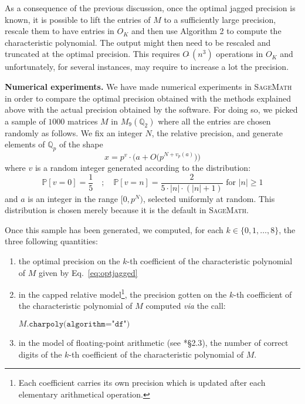 \documentclass{sig-alternate-05-2015}
\newcommand{\Q}{\mathbb Q}
\newcommand{\softO}{O\tilde{~}}
\begin{document}
\begin{rem} \label{rem:lift_for_optimal}
As a consequence of the previous discussion, once the optimal jagged 
precision is known, it is possible to lift the entries of $M$ to a sufficiently
large precision, rescale them to have entries in $O_K$
and then use Algorithm 2 to
compute the characteristic polynomial.
The output might then need to be rescaled and
 truncated at the optimal precision. 
This requires $\softO(n^3)$ operations in $O_K$ 
and unfortunately, for several instances, may require to increase a lot the precision.
\end{rem}

\medskip

\noindent
{\bf Numerical experiments.}
We have made numerical experiments in \textsc{SageMath}~\cite{sage}
in order to compare the optimal precision obtained with the methods
explained above with the actual precision obtained by the software.
For doing so, we picked a sample of $1000$ matrices $M$ in 
$M_9(\Q_2)$ where all the entries are chosen randomly as follows.
We fix an integer $N$, the relative precision, and generate elements of $\Q_p$ of the shape
\[
x = p^v \cdot \big(a + O\big(p^{N+v_p(a)}\big)\big)
\]
where $v$ is a random integer generated according to the distribution:
\[
\mathbb P [v = 0] = \frac 1 5 \quad ; \quad
\mathbb P [v = n] = \frac 2 {5\cdot |n| \cdot (|n|+1)} \text{ for }
|n| \geq 1
\]
and $a$ is an integer in the range $[0, p^N)$, selected uniformly at random.
This distribution is chosen merely because it is the default in \textsc{SageMath}.

Once this sample has been generated, we computed, for each $k \in \{0, 
1, \ldots, 8\}$, the three following quantities:

\vspace{-2mm}

\begin{enumerate}[$\bullet$]
\renewcommand{\itemsep}{0pt}
\item the optimal precision on the $k$-th coefficient of the 
characteristic polynomial of $M$ given by Eq.~\eqref{eq:optjagged}
\item in the capped relative model\footnote{Each 
coefficient carries its own precision which is updated after each 
elementary arithmetical operation.},
the precision gotten on the $k$-th coefficient of the 
characteristic polynomial of $M$ computed \emph{via} the call:

\hfill$M\texttt{.charpoly(algorithm="df")}$\hfill\null

\item in the model of floating-point arithmetic (see 
\cite{caruso:17a}*{\S 2.3}), the number of correct digits of the 
$k$-th coefficient of the characteristic polynomial of $M$.
\end{enumerate}
\end{document}
